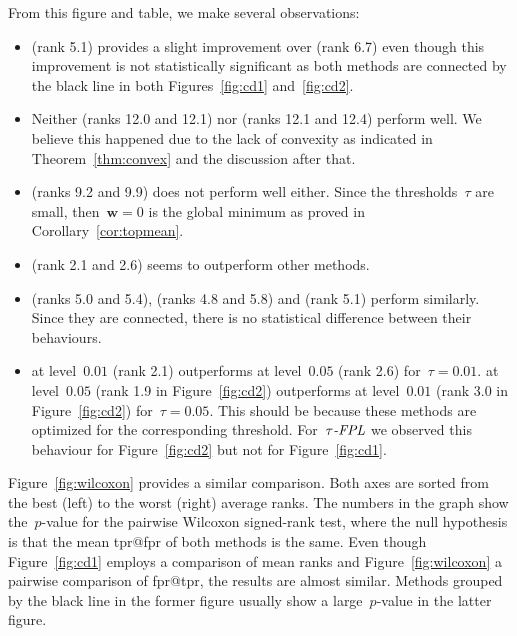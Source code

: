 From this figure and table, we make several observations:
\begin{itemize}
  \item \TopPushK (rank 5.1) provides a slight improvement over \TopPush (rank 6.7) even though this improvement is not statistically significant as both methods are connected by the black line in both Figures~\ref{fig:cd1} and~\ref{fig:cd2}.
  \item Neither \Grill (ranks 12.0 and 12.1) nor \GrillNP (ranks 12.1 and 12.4) perform well. We believe this happened due to the lack of convexity as indicated in Theorem~\ref{thm:convex} and the discussion after that.
  \item \TopMeanK (ranks 9.2 and 9.9) does not perform well either. Since the thresholds~$\tau$ are small, then~$\bm{w}=0$ is the global minimum as proved in Corollary~\ref{cor:topmean}.
  \item \PatMatNP (rank 2.1 and 2.6) seems to outperform other methods.
  \item \PatMat (ranks 5.0 and 5.4), \tauFPL (ranks 4.8 and 5.8) and \TopPushK (rank 5.1) perform similarly. Since they are connected, there is no statistical difference between their behaviours.
  \item \PatMatNP at level~$0.01$ (rank 2.1) outperforms \PatMatNP at level~$0.05$ (rank 2.6) for~$\tau=0.01$. \PatMatNP at level~$0.05$ (rank 1.9 in Figure~\ref{fig:cd2}) outperforms \PatMatNP at level~$0.01$ (rank 3.0 in Figure~\ref{fig:cd2}) for~$\tau=0.05$. This should be because these methods are optimized for the corresponding threshold. For~${\emph{$\tau$-FPL}}$ we observed this behaviour for Figure~\ref{fig:cd2} but not for Figure~\ref{fig:cd1}.
\end{itemize}

Figure~\ref{fig:wilcoxon} provides a similar comparison. Both axes are sorted from the best (left) to the worst (right) average ranks. The numbers in the graph show the~$p$-value for the pairwise Wilcoxon signed-rank test, where the null hypothesis is that the mean tpr@fpr of both methods is the same. Even though Figure~\ref{fig:cd1} employs a comparison of mean ranks and Figure~\ref{fig:wilcoxon} a pairwise comparison of fpr@tpr, the results are almost similar. Methods grouped by the black line in the former figure usually show a large~$p$-value in the latter figure.

